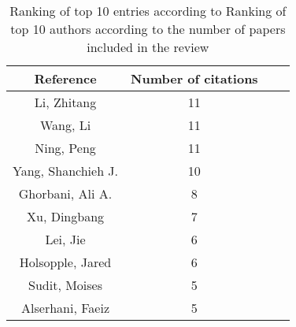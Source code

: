 \documentclass{article}
\begin{document}
\begin{table}[h!]
\caption{Ranking of top 10 entries according to Ranking of top 10 authors according to the number of papers included in the review}
\begin{tabular}{cccc}
\hline
Reference & Number of citations\\ \hline
Li, Zhitang & 11\\
Wang, Li & 11\\
Ning, Peng & 11\\
Yang, Shanchieh J. & 10\\
Ghorbani, Ali A. & 8\\
Xu, Dingbang & 7\\
Lei, Jie & 6\\
Holsopple, Jared & 6\\
Sudit, Moises & 5\\
Alserhani, Faeiz & 5\\
\end{tabular}
\end{table}
\end{document}
